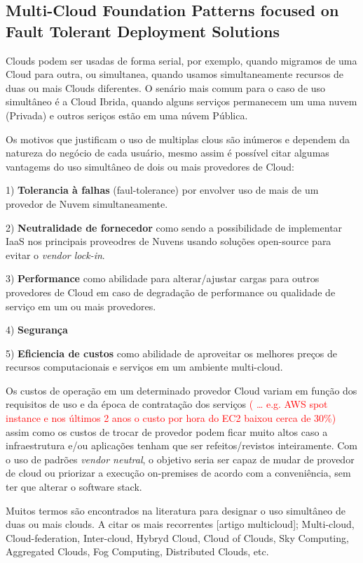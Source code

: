\documentclass[12pt]{article}
\begin{document}
	\subsection{Multi-Cloud Foundation Patterns focused on Fault Tolerant Deployment Solutions}
	
	Clouds podem ser usadas de forma serial, por exemplo, quando migramos de uma Cloud para outra, ou simultanea, quando usamos simultaneamente recursos de duas ou mais Clouds diferentes. O senário mais comum para o caso de uso simultâneo é a Cloud Ibrida, quando alguns serviços permanecem um uma nuvem (Privada) e outros seriços estão em uma núvem Pública.
	
	Os motivos que justificam o uso de multiplas clous são inúmeros e dependem da natureza do negócio de cada usuário, mesmo assim é possível citar algumas vantagems do uso simultâneo de dois ou mais provedores de Cloud:
	
	1) \textbf{Tolerancia à falhas} (faul-tolerance) por envolver uso de mais de um provedor de Nuvem simultaneamente.
	
	2) \textbf{Neutralidade de fornecedor} como sendo a possibilidade de implementar IaaS nos principais proveodres de Nuvens usando soluções open-source para evitar o \textit{vendor lock-in}.
	
	3) \textbf{Performance} como abilidade para alterar/ajustar cargas para outros provedores de Cloud em caso de degradação de performance ou qualidade de serviço em um ou mais provedores.
	
	4) \textbf{Segurança}
	
	5) \textbf{Eficiencia de custos} como abilidade de aproveitar os melhores preços de recursos computacionais e serviços em um ambiente multi-cloud.
	
	Os custos de operação em um determinado provedor Cloud variam em função dos requisitos de uso e da época de contratação dos serviços \textcolor{red}{( … e.g. AWS spot instance e nos últimos 2 anos o custo por hora do EC2 baixou cerca de 30\%)} assim como os custos de trocar de provedor podem ficar muito altos caso a infraestrutura e/ou aplicações tenham que ser refeitos/revistos inteiramente. Com o uso de padrões \textit{vendor neutral}, o objetivo seria ser capaz de mudar de provedor de cloud ou priorizar a execução on-premises de acordo com a conveniência, sem ter que alterar o software stack.
	
	Muitos termos são encontrados na literatura para designar o uso simultâneo de duas ou mais clouds. A citar os mais recorrentes [artigo multicloud]; Multi-cloud, Cloud-federation, Inter-cloud, Hybryd Cloud, Cloud of Clouds, Sky Computing, Aggregated Clouds, Fog Computing, Distributed Clouds, etc.
	
\end{document}
